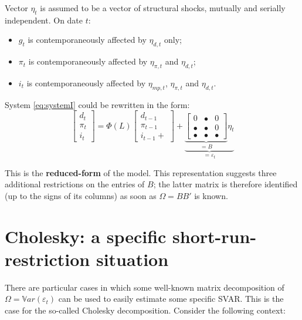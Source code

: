 \documentclass[
  12pt,
]{book}
\providecommand{\tightlist}{%
  \setlength{\itemsep}{0pt}\setlength{\parskip}{0pt}}
\theoremstyle{definition}
\theoremstyle{definition}
\theoremstyle{definition}
\theoremstyle{definition}
\theoremstyle{remark}
\begin{document}
Vector \(\eta_t\) is assumed to be a vector of structural shocks, mutually and serially independent. On date \(t\):

\begin{itemize}
\tightlist
\item
  \(g_t\) is contemporaneously affected by \(\eta_{d,t}\) only;
\item
  \(\pi_t\) is contemporaneously affected by \(\eta_{\pi,t}\) and \(\eta_{d,t}\);
\item
  \(i_t\) is contemporaneously affected by \(\eta_{mp,t}\), \(\eta_{\pi,t}\) and \(\eta_{d,t}\).
\end{itemize}

System \eqref{eq:systemI} could be rewritten in the form:
\begin{equation}
\left[\begin{array}{c}
d_t\\
\pi_t\\
i_t
\end{array}\right]
= \Phi(L)
\left[\begin{array}{c}
d_{t-1}\\
\pi_{t-1}\\
i_{t-1} +
\end{array}\right] +\underbrace{\underbrace{
\left[
\begin{array}{ccc}
0 & \bullet & 0 \\
\bullet & \bullet & 0 \\
\bullet & \bullet & \bullet
\end{array}
\right]}_{=B} \eta_t}_{=\varepsilon_t}\label{eq:BBBB}
\end{equation}

This is the \textbf{reduced-form} of the model. This representation suggests three additional restrictions on the entries of \(B\); the latter matrix is therefore identified (up to the signs of its columns) as soon as \(\Omega = BB'\) is known.

\hypertarget{cholesky-a-specific-short-run-restriction-situation}{%
\section{Cholesky: a specific short-run-restriction situation}\label{cholesky-a-specific-short-run-restriction-situation}}

There are particular cases in which some well-known matrix decomposition of \(\Omega=\mathbb{V}ar(\varepsilon_t)\) can be used to easily estimate some specific SVAR. This is the case for the so-called Cholesky decomposition. Consider the following context:
\end{document}
